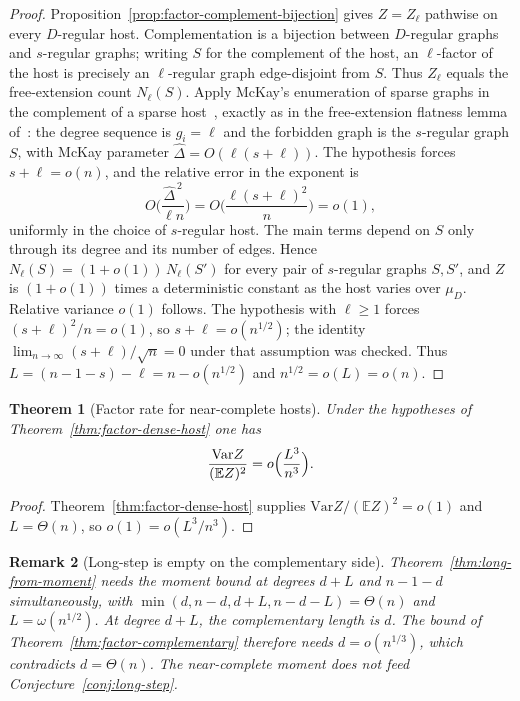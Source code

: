 \documentclass[11pt]{article}
\newtheorem{theorem}{Theorem}
\newtheorem{remark}[theorem]{Remark}
\newcommand{\EE}{\mathbb{E}}
\newcommand{\Var}{\mathrm{Var}}
\begin{document}
\begin{proof}
Proposition~\ref{prop:factor-complement-bijection} gives \(Z=Z_\ell\) pathwise on every
\(D\)-regular host. Complementation is a bijection between \(D\)-regular graphs and
\(s\)-regular graphs; writing \(S\) for the complement of the host, an \(\ell\)-factor
of the host is precisely an \(\ell\)-regular graph edge-disjoint from \(S\). Thus
\(Z_\ell\) equals the free-extension count \(N_\ell(S)\).
Apply McKay's enumeration of sparse graphs in the complement of a sparse
host~\cite[Theorem~4.6]{McK85}, exactly as in the free-extension flatness lemma
of~\cite{PlusOneV1}: the degree sequence is \(g_i=\ell\) and the forbidden graph is
the \(s\)-regular graph \(S\), with McKay parameter
\(\widehat\Delta=O(\ell(s+\ell))\). The hypothesis forces \(s+\ell=o(n)\), and the
relative error in the exponent is
\[
O\Biggl(\frac{\widehat\Delta^{\,2}}{\ell n}\Biggr)
=
O\Biggl(\frac{\ell(s+\ell)^2}{n}\Biggr)
=
o(1),
\]
uniformly in the choice of \(s\)-regular host. The main terms depend on \(S\) only
through its degree and its number of edges. Hence
\(N_\ell(S)=(1+o(1))\,N_\ell(S')\) for every pair of \(s\)-regular graphs \(S,S'\), and
\(Z\) is \((1+o(1))\) times a deterministic constant as the host varies over
\(\mu_D\). Relative variance \(o(1)\) follows.
The hypothesis with \(\ell\ge 1\) forces \((s+\ell)^2/n=o(1)\), so
\(s+\ell=o(n^{1/2})\); the identity
\(\lim_{n\to\infty}(s+\ell)/\sqrt{n}=0\) under that assumption was checked.
Thus \(L=(n-1-s)-\ell=n-o(n^{1/2})\) and \(n^{1/2}=o(L)=o(n)\).
\end{proof}

\begin{theorem}[Factor rate for near-complete hosts]
\label{thm:factor-rate-dense-host}
Under the hypotheses of Theorem~\ref{thm:factor-dense-host} one has
\[
\frac{\Var Z}{(\EE Z)^2}=o\Bigl(\frac{L^3}{n^3}\Bigr).
\]
\end{theorem}

\begin{proof}
Theorem~\ref{thm:factor-dense-host} supplies \(\Var Z/(\EE Z)^2=o(1)\) and
\(L=\Theta(n)\), so \(o(1)=o(L^3/n^3)\).
\end{proof}

\begin{remark}[Long-step is empty on the complementary side]
\label{rem:long-complement-empty}
Theorem~\ref{thm:long-from-moment} needs the moment bound at degrees \(d+L\) and
\(n-1-d\) simultaneously, with \(\min(d,n-d,d+L,n-d-L)=\Theta(n)\) and
\(L=\omega(n^{1/2})\). At degree \(d+L\), the complementary length is \(d\). The
bound of Theorem~\ref{thm:factor-complementary} therefore needs \(d=o(n^{1/3})\),
which contradicts \(d=\Theta(n)\). The near-complete moment does not feed
Conjecture~\ref{conj:long-step}.
\end{remark}
\end{document}

